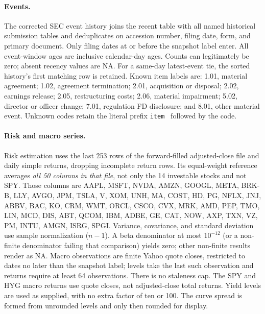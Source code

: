 \paragraph{Events.}
The corrected SEC event history joins the recent table with all named
historical submission tables and deduplicates on accession number,
filing date, form, and primary document. Only filing dates at or before
the snapshot label enter. All event-window ages are inclusive calendar-day
ages. Counts can legitimately be zero; absent recency values are NA.
For a same-day latest-event tie, the sorted history's first matching row
is retained. Known item labels are: 1.01, material agreement; 1.02,
agreement termination; 2.01, acquisition or disposal; 2.02, earnings
release; 2.05, restructuring costs; 2.06, material impairment; 5.02,
director or officer change; 7.01, regulation FD disclosure; and 8.01,
other material event. Unknown codes retain the literal prefix
\texttt{item } followed by the code.

\paragraph{Risk and macro series.}
Risk estimation uses the last 253 rows of the forward-filled adjusted-close
file and daily simple returns, dropping incomplete return rows.
Its equal-weight reference averages \emph{all 50 columns in that file},
not only the 14 investable stocks and not SPY. Those columns are
AAPL, MSFT, NVDA, AMZN, GOOGL, META, BRK-B, LLY, AVGO, JPM, TSLA, V, XOM, UNH, MA, COST, HD, PG, NFLX, JNJ, ABBV, BAC, KO, CRM, WMT, ORCL, CSCO, CVX, MRK, AMD, PEP, TMO, LIN, MCD, DIS, ABT, QCOM, IBM, ADBE, GE, CAT, NOW, AXP, TXN, VZ, PM, INTU, AMGN, ISRG, SPGI.
Variance, covariance, and standard deviation use sample normalization
($n-1$). A beta denominator at most $10^{-12}$ (or a non-finite denominator
failing that comparison) yields zero; other non-finite results render as
NA. Macro observations are finite Yahoo quote closes, restricted to dates
no later than the snapshot label; levels take the last such observation
and returns require at least 64 observations. There is no staleness cap.
The SPY and HYG macro returns use quote closes, not adjusted-close total
returns. Yield levels are used as supplied, with no extra factor of ten
or 100. The curve spread is formed from unrounded levels and only then
rounded for display.

